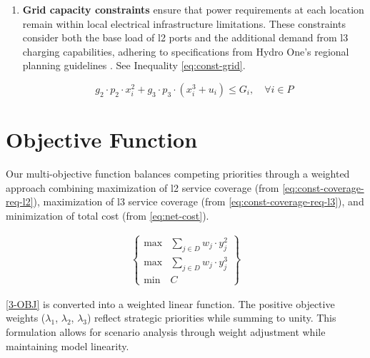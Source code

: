 \begin{enumerate}
    \begin{align}
        \sum_{j \in D}(w_j \cdot y^2_j) & \geq \alpha_2
        \label {eq:const-coverage-req-l2} \\
        \sum_{j \in D}(w_j \cdot y^3_j) & \geq \alpha_3
        \label{eq:const-coverage-req-l3}
    \end{align}

    \item \textbf{Grid capacity constraints} ensure that power requirements at each location remain within local electrical infrastructure limitations. These constraints consider both the base load of \gls{l2} ports and the additional demand from \gls{l3} charging capabilities, adhering to specifications from Hydro One's regional planning guidelines \cite{hydro2021} \cite{hydro2024}. See Inequality \ref{eq:const-grid}.

    \begin{equation}
        g_2 \cdot p_2 \cdot x^2_i + g_3 \cdot p_3 \cdot (x^3_i + u_i) \leq G_i, \quad \forall i \in P
        \label{eq:const-grid}
    \end{equation}
\end{enumerate} 

\section{Objective Function}

Our multi-objective function balances competing priorities through a weighted approach combining maximization of \gls{l2} service coverage (from \ref{eq:const-coverage-req-l2}), maximization of \gls{l3} service coverage (from \ref{eq:const-coverage-req-l3}), and minimization of total cost (from \ref{eq:net-cost}).

\begin{align}
    \left\{
    \begin{array}{ll}
        \max & \sum\limits_{j \in D} w_j \cdot y^2_j \\[1.5em]
        \max & \sum\limits_{j \in D} w_j \cdot y^3_j \\[1.5em]
        \min & C
    \end{array}
    \right\} \tag{3-OBJ} \label{3-OBJ}
\end{align}

\eqref{3-OBJ} is converted into a weighted linear function. The positive objective weights ($\lambda_1$, $\lambda_2$, $\lambda_3$) reflect strategic priorities while summing to unity. This formulation allows for scenario analysis through weight adjustment while maintaining model linearity.

